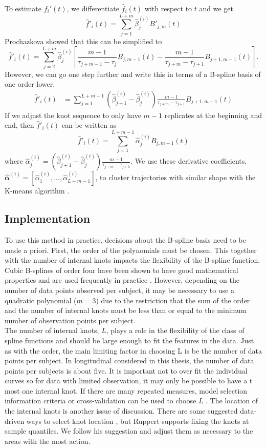 \documentclass[12pt]{article}
\newcommand{\bs}[0]{\boldsymbol}
\begin{document}
To estimate $f_i'(t)$, we differentiate $\hat{f}_i(t)$ with respect to $t$ and we get
$$\hat{f}'_i(t)=\sum^{L+m}_{j=1} \hat{\beta}^{(i)}_j B'_{j,m}(t)$$
Prochazkova \cite{prochazkova2005} showed that this can be simplified to
$$\hat{f}'_i(t)=\sum^{L+m}_{j=2} \hat{\beta}^{(i)}_j \left[\frac{m-1}{\tau_{j+m-1}-\tau_j} B_{j,m-1}(t)-\frac{m-1}{\tau_{j+m}-\tau_{j+1}} B_{j+1,m-1}(t)\right].$$
However, we can go one step further and write this in terms of a B-spline basis of one order lower.
\begin{align*}
\hat{f}'_i(t)&=\sum^{L+m-1}_{j=1} (\hat{\beta}^{(i)}_{j+1} -\hat{\beta}^{(i)}_j)\frac{m-1}{\tau_{j+m}-\tau_{j+1} }B_{j+1,m-1}(t)
\end{align*}
If we adjust the knot sequence to only have $m-1$ replicates at the beginning and end, then $\hat{f}'_{i}(t)$ can be written as
$$\hat{f}'_i(t)=\sum^{L+m-1}_{j=1}\hat{\alpha}^{(i)}_jB_{j,m-1}(t)$$
where $\hat{\alpha}^{(i)}_j= (\hat{\beta}^{(i)}_{j+1} -\hat{\beta}^{(i)}_j)\frac{m-1}{\tau_{j+m}-\tau_{j+1} }$.
We use these derivative coefficients, $\hat{\bs \alpha}^{(i)} = [\hat{\alpha}^{(i)}_1,...,\hat{\alpha}^{(i)}_{ L+m-1}]$, to cluster trajectories with similar shape with the K-means algorithm \cite{macqueen1967, hartigan1979}. 
\subsection{Implementation}
To use this method in practice, decisions about the B-spline basis need to be made a priori. First, the order of the polynomials must be chosen. This together with the number of internal knots impacts the flexibility of the B-spline function. Cubic B-splines of order four have been shown to have good mathematical properties and are used frequently in practice \cite{james2003}. However, depending on the number of data points observed per subject, it may be necessary to use a quadratic polynomial ($m = 3$) due to the restriction that the sum of the order and the number of internal knots must be less than or equal to the minimum number of observation points per subject. \\

The number of internal knots, $L$, plays a role in the flexibility of the class of spline functions and should be large enough to fit the features in the data. Just as with the order, the main limiting factor in choosing L is be the number of data points per subject. In longitudinal considered in this thesis, the number of data points per subjects is about five. It is important not to over fit the individual curves so for data with limited observation, it may only be possible to have a t most one internal knot. If there are many repeated measures, model selection information criteria or cross-validation can be used to choose $L$ \cite{rice2001}. The location of the internal knots is another issue of discussion. There are some suggested data-driven ways to select knot location \cite{shanggang2001}, but Ruppert \cite{ruppert2002} supports fixing the knots at sample quantiles. We follow his suggestion and adjust them as necessary to the areas with the most action. \\
\end{document}
